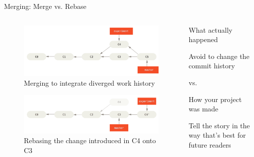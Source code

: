 \begin{frame}[fragile]{Merging: Merge vs. Rebase}
  \begin{columns}
    \begin{column}{0.7\textwidth}
      \begin{figure}
        \includegraphics[width=\textwidth]{branching/basic-rebase-2}
        \caption{Merging to integrate diverged work history}
      \end{figure}
      \begin{figure}
        \includegraphics[width=\textwidth]{branching/basic-rebase-3}
        \caption{Rebasing the change introduced in C4 onto C3}
      \end{figure}
    \end{column}
    \begin{column}{0.3\textwidth}
      What actually happened
      \begin{flushleft}
        \footnotesize
        Avoid to change the commit history
      \end{flushleft}
      \begin{center}
        vs.
      \end{center}
      How your project was made
      \begin{flushleft}
        \footnotesize
        Tell the story in the way that’s best for future readers
      \end{flushleft}
    \end{column}
  \end{columns}
\end{frame}
